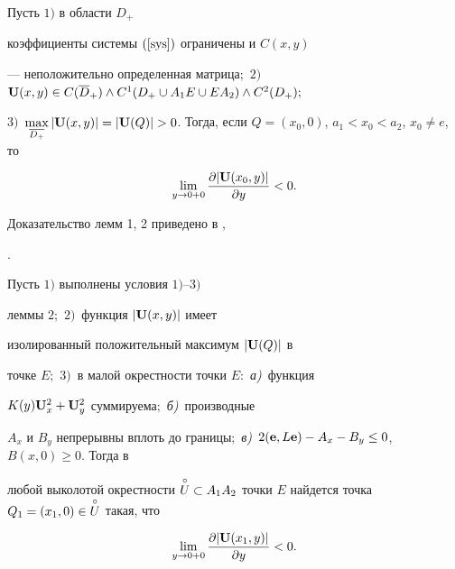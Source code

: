 \begin{lem}


Пусть $1)$ в области $D_+$


коэффициенты системы $(\ref{sys})$ ограничены и $C(x,y)$


--- неположительно определенная матрица$;$ $2)$~${\bold U}(x,y)


\in C(\overline{D}_+) \land C^1(D_+ \cup A_1E \cup EA_2) \land C^2(D_+);$


$3)$~$\max\limits_{\overline{D_+}}|{\bold U}(x,y)|=|{\bold


U}(Q)|>0$. Тогда, если $Q=(x_0,0)$, $a_1<x_0<a_2$, $x_0 \ne e$, то


$$


\lim_{y \to 0+0}\frac{\partial |{\bold U}(x_0,y)|}{\partial y} < 0.


$$


\end{lem}





Доказательство лемм 1, 2 приведено в \cite{SabDAN},


\cite{SaId}.





\begin{lem}


Пусть $1)$ выполнены условия $1)$--$3)$


леммы $2;$ $2)$~функция $|{\bold U}(x,y)|$ имеет


изолированный положительный максимум $|{\bold U}(Q)|$ в


точке $E;$ $3)$~в малой окрестности точки $E{:}$ {\em а)}~функция


$K(y){\bold U}_x^2 + {\bold U}_y^2$ суммируема$;$ {\em б)}~производные


$A_x$ и $B_y$ непрерывны вплоть до границы$;$ {\em в)}~$2({\bold


e},L{\bold e}) - A_x - B_y \le 0$, $B(x,0)\ge 0$. Тогда в


любой выколотой окрестности $\up{\circ}{U}


\subset A_1A_2$ точки $E$ найдется точка $Q_1=(x_1,0) \in


\up{\circ}{U}$ такая, что


\begin{equation}\label{l3<0}


\lim_{y \to 0+0}\frac{\partial |{\bold U}(x_1,y)|}{\partial y} < 0.


\end{equation}


\end{lem}





